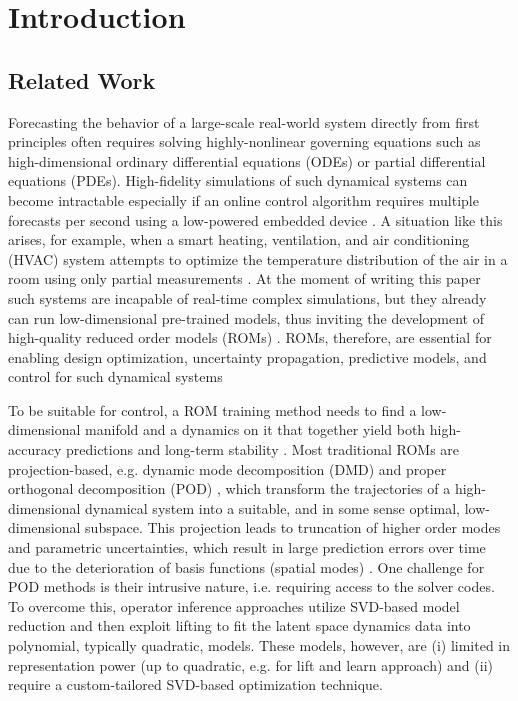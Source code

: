 
\section{Introduction}
\subsection{Related Work}
        Forecasting the behavior of a large-scale real-world system directly from first principles often requires solving highly-nonlinear governing equations such as high-dimensional ordinary differential equations (ODEs) or partial differential equations (PDEs). 
        High-fidelity simulations of such dynamical systems can become intractable especially if an online control algorithm requires multiple forecasts per second using a low-powered embedded device \cite{rowley2017model,lucia2004reduced,benner2015survey}. A situation like this arises, for example, when a smart heating, ventilation, and air conditioning (HVAC) system attempts to optimize the temperature distribution of the air in a room using only partial measurements \cite{farahmand2016learning,nabi2022robust}. At the moment of writing this paper such systems are incapable of real-time complex simulations, but they already can run low-dimensional pre-trained models, thus inviting the development of high-quality reduced order models (ROMs) \cite{otterness2017evaluation} . ROMs, therefore, are essential for enabling design optimization, uncertainty propagation, predictive models, and control for such dynamical systems \cite{brunton2022data,kutz2016dynamic,rowley2017model,jones2020characterising}
        
        To be suitable for control, a ROM training method needs to find a low-dimensional manifold and a dynamics on it that together yield both high-accuracy predictions and long-term stability \cite{ahmed2021closures,noack2011reduced}. Most traditional ROMs are projection-based, e.g. dynamic mode decomposition (DMD) \cite{kutz2016dynamic,tu2013dynamic} and proper orthogonal decomposition (POD) \cite{holmes2012turbulence}, which transform the trajectories of a high-dimensional dynamical system into a suitable, and in some sense optimal, low-dimensional subspace. This projection leads to truncation of higher order modes and parametric uncertainties, which result in large prediction errors over time due to the deterioration of basis functions (spatial modes) \cite{benner2015survey}. 
        One challenge for POD methods is their intrusive nature, i.e. requiring access to the solver codes.
       To overcome this, operator inference approaches \cite{qian2020lift,peherstorfer2016data} utilize SVD-based model reduction and then exploit lifting to fit the latent space dynamics data into
        polynomial, typically quadratic, models.
        These models, however, are (i) limited in representation power (up to quadratic, e.g. for lift and learn approach) and (ii) require a custom-tailored SVD-based optimization technique. 
        
